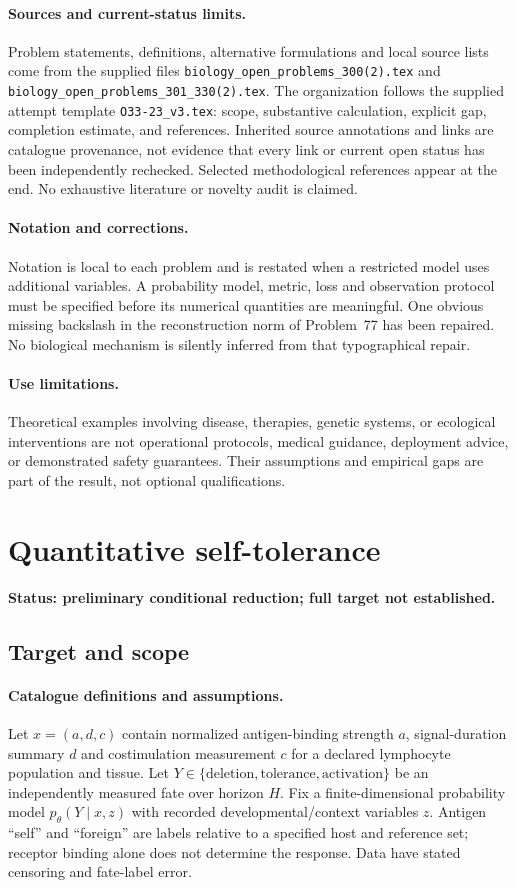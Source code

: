 \documentclass[11pt]{article}
\begin{document}
\paragraph{Sources and current-status limits.}
Problem statements, definitions, alternative formulations and local source lists
come from the supplied files
\texttt{biology\_open\_problems\_300(2).tex} and
\texttt{biology\_open\_problems\_301\_330(2).tex}.
The organization follows the supplied attempt template
\texttt{O33-23\_v3.tex}: scope, substantive calculation, explicit gap,
completion estimate, and references. Inherited source annotations and links are
catalogue provenance, not evidence that every link or current open status has
been independently rechecked. Selected methodological references appear at the
end. No exhaustive literature or novelty audit is claimed.

\paragraph{Notation and corrections.}
Notation is local to each problem and is restated when a restricted model uses
additional variables. A probability model, metric, loss and observation protocol
must be specified before its numerical quantities are meaningful. One obvious
missing backslash in the reconstruction norm of Problem~77 has been repaired.
No biological mechanism is silently inferred from that typographical repair.

\paragraph{Use limitations.}
Theoretical examples involving disease, therapies, genetic systems, or ecological
interventions are not operational protocols, medical guidance, deployment advice,
or demonstrated safety guarantees. Their assumptions and empirical gaps are part
of the result, not optional qualifications.


\section*{Quantitative self-tolerance}
\label{prob:234}
\noindent\textbf{Status: preliminary conditional reduction; full target not established.}
\subsection{Target and scope}
\paragraph{Catalogue definitions and assumptions.}
Let $x=(a,d,c)$ contain normalized antigen-binding strength $a$, signal-duration summary $d$ and costimulation measurement $c$ for a declared lymphocyte population and tissue. Let $Y\in\{\mathrm{deletion},\mathrm{tolerance},\mathrm{activation}\}$ be an independently measured fate over horizon $H$. Fix a finite-dimensional probability model $p_\theta(Y\mid x,z)$ with recorded developmental/context variables $z$. Antigen ``self'' and ``foreign'' are labels relative to a specified host and reference set; receptor binding alone does not determine the response. Data have stated censoring and fate-label error.
\end{document}
